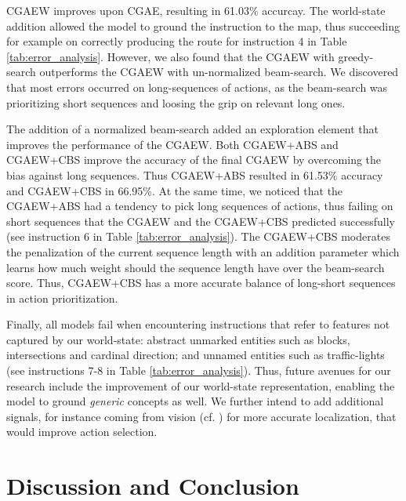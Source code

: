 \documentclass[11pt,a4paper]{article}
\begin{document}
CGAEW improves upon CGAE, resulting in  61.03\% accurcay. The world-state addition allowed the model to ground the instruction to the map, thus succeeding for example on correctly producing the route for instruction 4 in Table \ref{tab:error_analysis}. 
However, we also found that the CGAEW with greedy-search outperforms the CGAEW  with  un-normalized beam-search. We discovered that most errors occurred on long-sequences of actions, as the beam-search was prioritizing short sequences and loosing the grip on relevant long ones.

The addition of a normalized beam-search added an exploration element that improves the performance of the CGAEW. 
Both CGAEW+ABS and CGAEW+CBS improve the accuracy of the final CGAEW by overcoming the bias against long sequences. Thus CGAEW+ABS resulted in 61.53\% accuracy and CGAEW+CBS in 66.95\%. 
%
At the same time, we noticed that the CGAEW+ABS had a tendency to pick long sequences of actions, thus failing on short sequences that the CGAEW and the CGAEW+CBS predicted successfully (see instruction 6 in Table \ref{tab:error_analysis}). The CGAEW+CBS moderates the penalization of the current sequence length with an addition parameter which learns how much weight should the sequence length have over the beam-search score.
Thus,  CGAEW+CBS has a more accurate balance of long-short sequences in action prioritization. 

Finally, all models fail when encountering  instructions that refer to features not captured by our world-state: abstract unmarked entities  such as blocks, intersections and cardinal direction; and unnamed entities such as traffic-lights (see instructions 7-8 in Table \ref{tab:error_analysis}). Thus, future avenues for our research include the improvement of our world-state representation, enabling the model to ground  {\em generic} concepts as well. We further intend to add additional signals, for instance coming from vision
(cf. ) for more accurate localization, that would improve action selection. 



 
\section{Discussion and Conclusion}
\label{conclusion}

\end{document}

